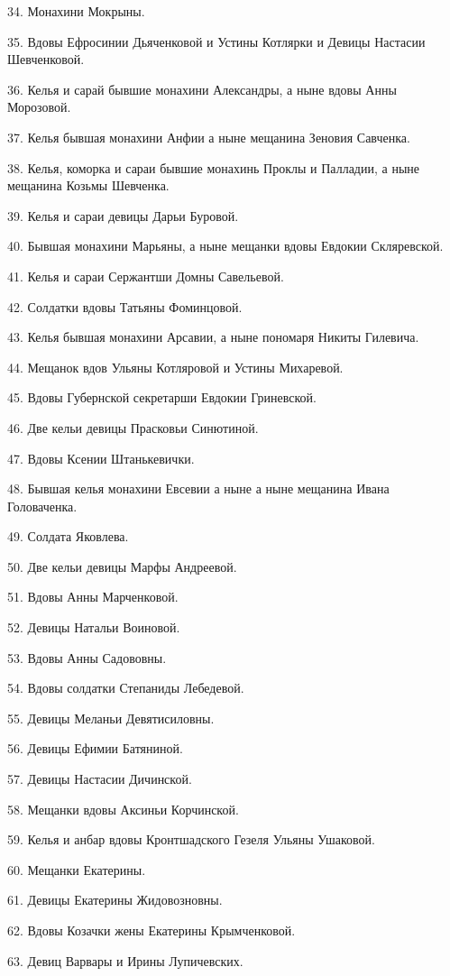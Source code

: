 34. Монахини Мокрыны.

35. Вдовы Ефросинии Дьяченковой и Устины Котлярки и Девицы Настасии Шевченковой.

36. Келья и сарай бывшие монахини Александры, а ныне вдовы Анны Морозовой.

37. Келья бывшая монахини Анфии а ныне мещанина Зеновия Савченка.

38. Келья, коморка и сараи бывшие монахинь Проклы и Палладии, а ныне мещанина Козьмы Шевченка.

39. Келья и сараи девицы Дарьи Буровой.

40. Бывшая монахини Марьяны, а ныне мещанки вдовы Евдокии Скляревской.

41. Келья и сараи Сержантши Домны Савельевой.

42. Солдатки вдовы Татьяны Фоминцовой.

43. Келья бывшая монахини Арсавии, а ныне пономаря Никиты Гилевича.

44. Мещанок вдов Ульяны Котляровой и Устины Михаревой.

45. Вдовы Губернской секретарши Евдокии Гриневской.

46. Две кельи девицы Прасковьи Синютиной.

47. Вдовы Ксении Штанькевички.

48. Бывшая келья монахини Евсевии а ныне а ныне мещанина Ивана Головаченка.

49. Солдата Яковлева.

50. Две кельи девицы Марфы Андреевой.

51. Вдовы Анны Марченковой.

52. Девицы Натальи Воиновой.

53. Вдовы Анны Садововны.

54. Вдовы солдатки Степаниды Лебедевой.

55. Девицы Меланьи Девятисиловны.

56. Девицы Ефимии Батяниной.

57. Девицы Настасии Дичинской.

58. Мещанки вдовы Аксиньи Корчинской.

59. Келья и анбар вдовы Кронтшадского Гезеля Ульяны Ушаковой.

60. Мещанки Екатерины.

61. Девицы Екатерины Жидовозновны.

62. Вдовы Козачки жены Екатерины Крымченковой.

63. Девиц Варвары и Ирины Лупичевских.

